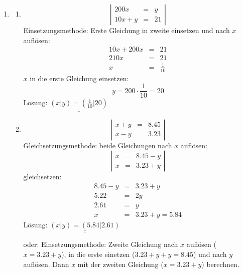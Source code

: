 \documentclass[%
11pt,%
twoside,%
titlepage,%
german,%
]{scrartcl}
\newcommand{\result}[1]{\underline{\underline{#1}}}
\begin{document}
\begin{enumerate}
\item 
  \begin{enumerate}
  \item 
    \begin{displaymath}
      \left| 
        \begin{array}{rcl}
          200x & = & y \\
          10x+y & = & 21
        \end{array} \right|
    \end{displaymath}
    Einsetzungsmethode: Erste Gleichung in zweite einsetzen und nach $x$ aufl\"osen:
    \begin{eqnarray*}
      10x+200x & = & 21 \\
      210x & = & 21 \\
      x & = & \frac{1}{10}
    \end{eqnarray*}
    $x$ in die erste Gleichung einsetzen:
    \begin{displaymath}
      y = 200 \cdot \frac{1}{10}=20
    \end{displaymath}
    L\"osung: $\result{(x|y)=(\frac{1}{10}|20)}$
    
  \item 
    \begin{displaymath}
      \left| 
        \begin{array}{rcl}
          x+y & = & 8.45 \\
          x-y & = & 3.23
        \end{array} \right|
    \end{displaymath}
Gleichsetzungsmethode: beide Gleichungen nach $x$ aufl\"osen:
    \begin{displaymath}
      \left| 
        \begin{array}{rcl}
          x & = & 8.45-y \\
          x & = & 3.23+y
        \end{array} \right|
    \end{displaymath}
gleichsetzen:
\begin{eqnarray*}
8.45-y & = & 3.23+y \\
5.22 & = & 2y \\
2.61 & = & y \\
x & = & 3.23+y = 5.84
\end{eqnarray*}
    L\"osung: $\result{(x|y)=(5.84|2.61)}$

    oder: Einsetzungsmethode: Zweite Gleichung nach $x$ aufl\"osen ($x=3.23+y$), in die erste einetzen ($3.23+y+y=8.45$) und nach $y$ aufl\"osen. Dann $x$ mit der zweiten Gleichung ($x=3.23+y$) berechnen.


\end{enumerate}
\end{enumerate}
\end{document}
